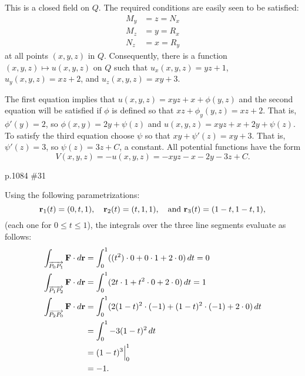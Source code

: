 \begin{pracsol}
  This is a closed field on $Q$. The required conditions are easily seen to be satisfied:
  \begin{align*}
    M_y &= z = N_x\\
    M_z &= y = R_x\\
    N_z &= x = R_y
  \end{align*}
  at all points $(x,y,z)$ in $Q$. Consequently, there is a function $(x,y,z)\mapsto u(x,y,z)$ on $Q$ such that $u_x(x,y,z)=yz+1$, $u_y(x,y,z)=xz+2$, and $u_z(x,y,z)=xy+3$.

  The first equation implies that $u(x,y,z)=xyz+x+\phi(y,z)$ and the second equation will be satisfied if $\phi$ is defined so that $xz+\phi_y(y,z)=xz+2$. That is, $\phi'(y)=2$, so $\phi(x,y)=2y+\psi(z)$ and $u(x,y,z)=xyz+x+2y+\psi(z)$. To satisfy the third equation choose $\psi$ so that $xy+\psi'(z)=xy+3$. That is, $\psi'(z)=3$, so $\psi(z)=3z+C$, a constant. All potential functions have the form
  \[V(x,y,z)=-u(x,y,z)=-xyz-x-2y-3z+C.\]
\end{pracsol}
\begin{practice}p.1084 \#31\end{practice}
\begin{pracsol}
  Using the following parametrizations:
  \[\mathbf r_1(t)=(0,t,1),\quad\mathbf r_2(t)=(t,1,1),\quad\text{and }\mathbf r_3(t)=(1-t,1-t,1),\]
  (each one for $0\leq t\leq 1$), the integrals over the three line segments evaluate as follows:
  \begin{align*}
    \int_{\overrightarrow{P_0P_1}}\mathbf F\cdot d\mathbf r &= \int_0^1 ((t^2)\cdot 0+0\cdot 1+2\cdot 0)\,dt=0\\
    \int_{\overrightarrow{P_1P_2}}\mathbf F\cdot d\mathbf r &= \int_0^1(2t\cdot 1+t^2\cdot 0+2\cdot 0)\,dt=1\\
    \int_{\overrightarrow{P_2P_0}}\mathbf F\cdot d\mathbf r &= \int_0^1 (2(1-t)^2\cdot(-1)+(1-t)^2\cdot(-1)+2\cdot 0)\,dt\\
    &= \int_0^1 -3(1-t)^2\,dt\\
    &= (1-t)^3\Big|_0^1\\
    &= -1.
  \end{align*}
\end{pracsol}

